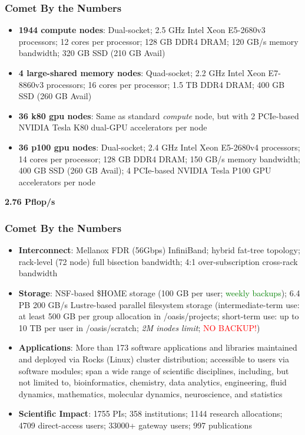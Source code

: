 \documentclass{beamer}
\begin{document}
\begin{frame}
   \frametitle{Comet By the Numbers}
   \begin{itemize}
      \small
      \setlength\itemsep{1.0em}
      \item \textbf{1944 compute nodes}: Dual-socket; 2.5 GHz Intel Xeon
         E5-2680v3 processors; 12 cores per processor; 128 GB DDR4 DRAM;
         120 GB/s memory bandwidth; 320 GB SSD (210 GB Avail)
      \item \textbf{4 large-shared memory nodes}: Quad-socket; 2.2 GHz
         Intel Xeon E7-8860v3 processors; 16 cores per processor; 1.5 TB
         DDR4 DRAM; 400 GB SSD (260 GB Avail)
      \item \textbf{36 k80 gpu nodes}: Same as standard
         \textit{compute} node, but with 2 PCIe-based NVIDIA Tesla K80
         dual-GPU accelerators per node
      \item \textbf{36 p100 gpu nodes}: Dual-socket; 2.4 GHz Intel Xeon
         E5-2680v4 processors; 14 cores per processor; 128 GB DDR4 DRAM;
         150 GB/s memory bandwidth; 400 GB SSD (260 GB Avail);  4
         PCIe-based NVIDIA Tesla P100 GPU accelerators per node
   \end{itemize}
   \begin{center}
      \textbf{2.76 Pflop/s}
   \end{center}
\end{frame}

\begin{frame}
   \frametitle{Comet By the Numbers}
   \begin{itemize}
      \small
      \setlength\itemsep{1.0em}
      \item \textbf{Interconnect}: Mellanox FDR (56Gbps) InfiniBand;
         hybrid fat-tree topology; rack-level (72 node) full bisection
         bandwidth; 4:1 over-subscription cross-rack bandwidth
      \item \textbf{Storage}: NSF-based \$HOME storage (100 GB per
         user; \textcolor{green}{weekly backups}); 6.4 PB 200 GB/s
         Lustre-based parallel filesystem storage (intermediate-term
         use: at least 500 GB per group allocation in /oasis/projects;
         short-term use: up to 10 TB per user in /oasis/scratch;
         \textit{2M inodes limit}; \textcolor{red}{NO BACKUP!})
      \item \textbf{Applications}: More than 173 software applications
         and libraries maintained and deployed via Rocks (Linux) cluster
         distribution; accessible to users via software modules; span a
         wide range of scientific disciplines, including, but not
         limited to, bioinformatics, chemistry, data analytics,
         engineering, fluid dynamics, mathematics, molecular dynamics,
         neuroscience, and statistics
      \item \textbf{Scientific Impact}: 1755 PIs; 358 institutions;
         1144 research allocations; 4709 direct-access users; 33000+
         gateway users; 997 publications
   \end{itemize}
\end{frame}
\end{document}
